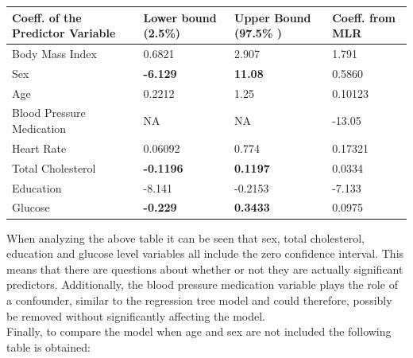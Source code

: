 \documentclass{article}\usepackage[]{graphicx}\usepackage[]{color}
\begin{document}
\begin{table}[h]
\begin{small}
    \begin{tabular}{llll}
       \hline \textbf{Coeff. of the Predictor Variable} & \textbf{Lower bound (2.5\%)} & \textbf{Upper Bound (97.5\% )} & \textbf{Coeff. from MLR}\\ \hline
    Body Mass Index                                  & 0.6821              & 2.907       &   1.791        \\
    Sex                                   & \textbf{-6.129}              & \textbf{11.08} & 0.5860            \\
    Age                                   & 0.2212              & 1.25        & 0.10123          \\
    Blood Pressure Medication                                & NA                  & NA    & -13.05                \\
    Heart Rate                              & 0.06092             & 0.774       & 0.17321          \\
    Total Cholesterol                                & \textbf{-0.1196}             & \textbf{0.1197}    & 0.0334        \\
    Education                                  & -8.141              & -0.2153     & -7.133          \\
    Glucose                             & \textbf{-0.229}              & \textbf{0.3433}    & 0.0975          \\
    \end{tabular}
    \end{small}
\end{table}

When analyzing the above table it can be seen that sex, total cholesterol, education and glucose level variables all include the zero confidence interval.  This means that there are questions about whether or not they are actually significant predictors.  Additionally, the blood pressure medication variable plays the role of a confounder, similar to the regression tree model and could therefore, possibly be removed without significantly affecting the model.\\

Finally, to compare the model when age and sex are not included the following table is obtained:
\end{document}
